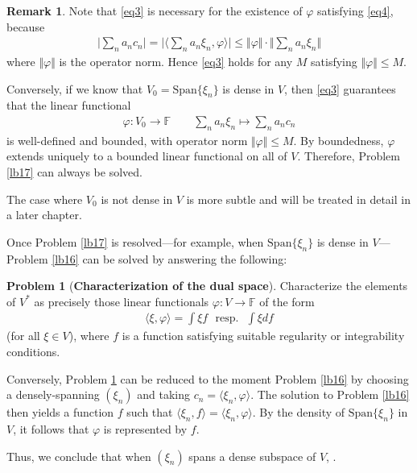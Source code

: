 \documentclass[12pt,b5paper,notitlepage]{article}
\theoremstyle{definition}
\newtheorem{rem}[df]{Remark}
\newtheorem{problem}[df]{Problem}
\theoremstyle{plain}
\newcommand{\Span}{\mathrm{Span}}
\newcommand{\bk}[1]{\langle {#1}\rangle}
\newcommand{\bigbk}[1]{\big\langle {#1}\big\rangle}
\newcommand{\Fbb}{\mathbb F}
\newcommand{\hqed}{\hfill\qedsymbol}
\numberwithin{equation}{section}
\begin{document}
\begin{rem}
Note that \eqref{eq3} is necessary for the existence of $\varphi$ satisfying \eqref{eq4}, because
\begin{align*}
\Big|\sum_n a_nc_n\Big|=\Big|\bigbk{\sum_n a_n\xi_n,\varphi} \Big|\leq \Vert\varphi\Vert\cdot \Big\Vert\sum_n a_n\xi_n\Big\Vert 
\end{align*}
where $\Vert\varphi\Vert$ is the operator norm. Hence \eqref{eq3} holds for any $M$ satisfying $\Vert\varphi\Vert\leq M$. 

Conversely, if we know that $V_0=\Span\{\xi_n\}$ is dense in $V$, then \eqref{eq3} guarantees that the linear functional
\begin{align*}
\varphi:V_0\rightarrow\Fbb\qquad \sum_n a_n\xi_n\mapsto \sum_n a_n c_n
\end{align*}
is well-defined and bounded, with operator norm $\Vert\varphi\Vert\leq M$. By boundedness, $\varphi$ extends uniquely to a bounded linear functional on all of $V$. Therefore, Problem \ref{lb17} can always be solved.

The case where $V_0$ is not dense in $V$ is more subtle and will be treated in detail in a later chapter.   \hqed
\end{rem}


Once Problem \ref{lb17} is resolved---for example, when $\Span\{\xi_n\}$ is dense in $V$---Problem \ref{lb16} can be solved by answering the following:

\begin{problem}[\textbf{Characterization of the dual space}]\label{lb22}
Characterize the elements of $V^*$ as precisely those linear functionals $\varphi:V\rightarrow\Fbb$ of the form
\begin{align*}
\bk{\xi,\varphi}=\int\xi f{\text{~ resp.~ }} \int\xi df
\end{align*}
(for all $\xi\in V$), where $f$ is a function satisfying suitable regularity or integrability conditions.
\end{problem}


Conversely, Problem \ref{lb22} can be reduced to the moment Problem \ref{lb16} by choosing a densely-spanning $(\xi_n)$ and taking $c_n=\bk{\xi_n,\varphi}$. The solution to Problem \ref{lb16} then yields a function $f$ such that $\bk{\xi_n,f}=\bk{\xi_n,\varphi}$. By the density of $\Span\{\xi_n\}$ in $V$, it follows that $\varphi$ is represented by $f$. 

Thus, we conclude that when $(\xi_n)$ spans a dense subspace of $V$, .
\end{document}
